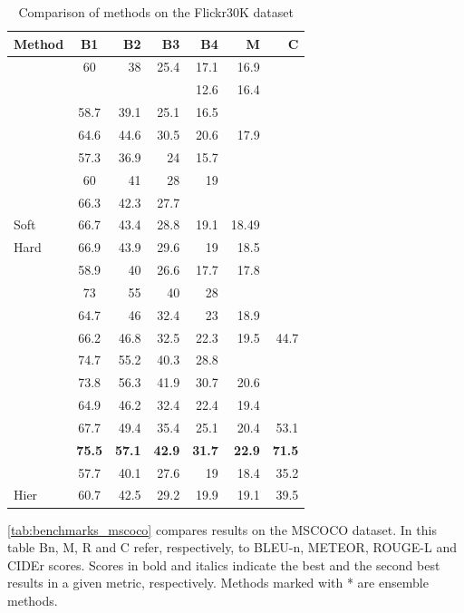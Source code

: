 \clearpage
\begin{table}[ht]
\caption{Comparison of methods on the Flickr30K dataset}
\begin{tabular}{lcrrrrr}
    \toprule
    Method	&	B1	&	B2	&	B3	&	B4	&	M	&	C	\\
    \midrule
    \citet{Kiros2014_LBL}	&	60	&	38	&	25.4	&	17.1	&	16.9	&		\\
    \citet{Chen2015}	&		&		&		&	12.6	&	16.4	&		\\
    \citet{Donahue2015}	&	58.7	&	39.1	&	25.1	&	16.5	&		&		\\
    \citet{Jia2015}	&	64.6	&	44.6	&	30.5	&	20.6	&	17.9	&		\\
    \citet{Karpathy2015}	&	57.3	&	36.9	&	24	&	15.7	&		&		\\
    \citet{Mao2015_mRNN}	&	60	&	41	&	28	&	19	&		&		\\
    \citet{Vinyals2015}	&	66.3	&	42.3	&	27.7	&		&		&		\\
    \citet{Xu2015} Soft	&	66.7	&	43.4	&	28.8	&	19.1	&	18.49	&		\\
    \citet{Xu2015} Hard	&	66.9	&	43.9	&	29.6	&	19	&	18.5	&		\\
    \citet{Oruganti2016}	&	58.9	&	40	&	26.6	&	17.7	&	17.8	&		\\
    \citet{Wu2016}	&	73	&	55	&	40	&	28	&		&		\\
    \citet{You2016}	&	64.7	&	46	&	32.4	&	23	&	18.9	&		\\
    \citet{Chen2017_SCA}	&	66.2	&	46.8	&	32.5	&	22.3	&	19.5	&	44.7	\\
    \citet{Gan2017_SCN}	&	74.7	&	55.2	&	40.3	&	28.8	&		&		\\
    \citet{Gu2017}	&	73.8	&	56.3	&	41.9	&	30.7	&	20.6	&		\\
    \citet{Fu2017}	&	64.9	&	46.2	&	32.4	&	22.4	&	19.4	&		\\
    \citet{Lu2017}	&	67.7	&	49.4	&	35.4	&	25.1	&	20.4	&	53.1	\\
    \citet{Li2018_VS-LSTM}	&	\textbf{75.5}	&	\textbf{57.1}	&	\textbf{42.9}	&	\textbf{31.7}	&	\textbf{22.9}	&	\textbf{71.5}	\\
    \citet{Wang2018} 	&	57.7	&	40.1	&	27.6	&	19	&	18.4	&	35.2	\\
    \citet{Wang2018} Hier	&	60.7	&	42.5	&	29.2	&	19.9	&	19.1	&	39.5	\\
    \bottomrule
\end{tabular}
\label{tab:benchmarks_flickr30k}
\end{table}

\cref{tab:benchmarks_mscoco} compares results on the MSCOCO dataset. In this table Bn, M, R and C refer, respectively, to BLEU-n, METEOR, ROUGE-L and CIDEr scores. Scores in bold and italics indicate the best and the second best results in a given metric, respectively. Methods marked with * are ensemble methods.

